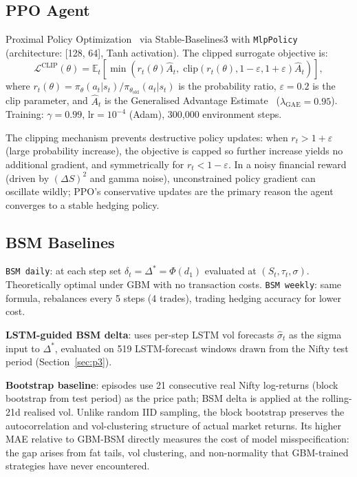 \documentclass[12pt,a4paper]{article}
\begin{document}
\subsection{PPO Agent}

Proximal Policy Optimization~\citep{Schulman2017} via Stable-Baselines3
\citep{Raffin2021} with \texttt{MlpPolicy} (architecture: [128, 64], Tanh
activation).  The clipped surrogate objective is:
\begin{equation}
  \mathcal{L}^{\mathrm{CLIP}}(\theta)
  = \mathbb{E}_t\!\left[\min\!\left(r_t(\theta)\hat{A}_t,\;
    \mathrm{clip}(r_t(\theta),1-\varepsilon,1+\varepsilon)\hat{A}_t\right)\right],
  \label{eq:ppo}
\end{equation}
where $r_t(\theta)=\pi_\theta(a_t|s_t)/\pi_{\theta_\mathrm{old}}(a_t|s_t)$
is the probability ratio, $\varepsilon=0.2$ is the clip parameter, and
$\hat{A}_t$ is the Generalised Advantage Estimate~\citep{Schulman2016}
($\lambda_{\mathrm{GAE}}=0.95$).  Training: $\gamma=0.99$, lr$=10^{-4}$
(Adam), 300,000 environment steps.

The clipping mechanism prevents destructive policy updates: when
$r_t > 1+\varepsilon$ (large probability increase), the objective is capped so
further increase yields no additional gradient, and symmetrically for
$r_t < 1-\varepsilon$.  In a noisy financial reward (driven by $(\Delta S)^2$
and gamma noise), unconstrained policy gradient can oscillate wildly;
PPO's conservative updates are the primary reason the agent converges to a
stable hedging policy.

\subsection{BSM Baselines}

\texttt{BSM daily}: at each step set $\delta_t = \Delta^* = \Phi(d_1)$
evaluated at $(S_t, \tau_t, \sigma)$.  Theoretically optimal under GBM with no
transaction costs.  \texttt{BSM weekly}: same formula, rebalances every 5 steps
(4 trades), trading hedging accuracy for lower cost.

\textbf{LSTM-guided BSM delta}: uses per-step LSTM vol forecasts $\hat\sigma_t$
as the sigma input to $\Delta^*$, evaluated on 519 LSTM-forecast windows drawn
from the Nifty test period (Section~\ref{sec:p3}).

\textbf{Bootstrap baseline}: episodes use 21 consecutive real Nifty
log-returns (block bootstrap from test period) as the price path; BSM delta is
applied at the rolling-21d realised vol.  Unlike random IID sampling, the block
bootstrap preserves the autocorrelation and vol-clustering structure of actual
market returns.  Its higher MAE relative to GBM-BSM directly measures the
cost of model misspecification: the gap arises from fat tails, vol clustering,
and non-normality that GBM-trained strategies have never encountered.
\end{document}
